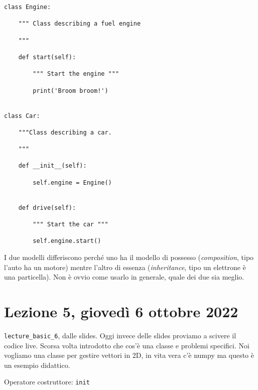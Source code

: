 \documentclass[10pt, a4paper, titlepage]{book}
\begin{document}
\begin{verbatim}
class Engine:

	""" Class describing a fuel engine

	"""

	def start(self):

		""" Start the engine """

		print('Broom broom!')


class Car:

	"""Class describing a car.

	"""

	def __init__(self):

		self.engine = Engine()

	
	def drive(self):

		""" Start the car """

		self.engine.start()
\end{verbatim}

I due modelli differiscono perché uno ha il modello di possesso (\textit{composition}, tipo l'auto ha un motore) mentre l'altro di essenza (\textit{inheritance}, tipo un elettrone è una particella). Non è ovvio come usarlo in generale, quale dei due sia meglio.


\section{Lezione 5, giovedì 6 ottobre 2022}

\texttt{lecture\_basic\_6}, dalle slides.
Oggi invece delle slides proviamo a scivere il codice live.
Scorsa volta introdotto che cos'è una classe e problemi specifici.
Noi vogliamo una classe per gestire vettori in 2D, in vita vera c'è numpy ma questo è un esempio didattico.

Operatore costruttore: \texttt{init} 
\end{document}
